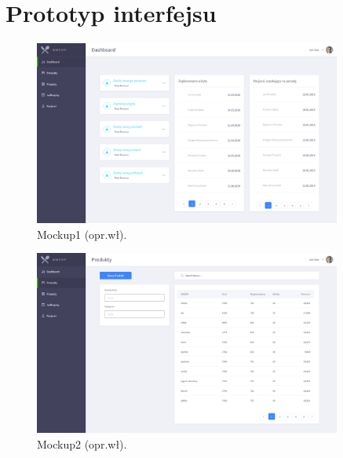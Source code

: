 \section{Prototyp interfejsu}
\begin{minipage}{\textwidth}
    \begin{figure}[H]
        \centering\includegraphics[width=0.9\textwidth]{img/mockups/mockup1.png}
        \caption{Mockup1 (opr.wł).}\label{rysunek:mockup1}
    \end{figure}
\end{minipage}

\begin{minipage}{\textwidth}
    \begin{figure}[H]
        \centering\includegraphics[width=0.9\textwidth]{img/mockups/mockup2.png}
        \caption{Mockup2 (opr.wł).}\label{rysunek:mockup2}
    \end{figure}
\end{minipage}

